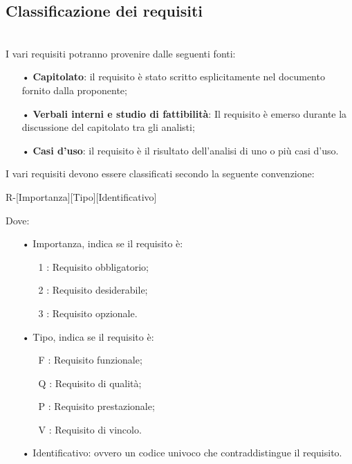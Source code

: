 \subsection{Classificazione dei requisiti}\mbox{}\\
I vari requisiti potranno provenire dalle seguenti fonti:
\begin{itemize}
	\item[•] \textbf{Capitolato}: il requisito è stato scritto esplicitamente nel documento fornito dalla proponente;
	\item[•] \textbf{Verbali interni e studio di fattibilità}: Il requisito è emerso durante la discussione del capitolato tra gli analisti;
	\item[•] \textbf{Casi d'uso}: il requisito è il risultato dell'analisi di uno o più casi d'uso.
\end{itemize}

I vari requisiti devono essere classificati secondo la seguente convenzione:
\begin{center}
	R-[Importanza][Tipo][Identificativo]
\end{center}
Dove:
\begin{itemize}
	\item[•] Importanza, indica se il requisito è:
	\begin{itemize}
		\item[1]: Requisito obbligatorio;
		\item[2]: Requisito desiderabile;
		\item[3]: Requisito opzionale.
	\end{itemize}
	\item[•] Tipo, indica se il requisito è:
	\begin{itemize}
		\item[F]: Requisito funzionale;
		\item[Q]: Requisito di qualità;
		\item[P]: Requisito prestazionale;
		\item[V]: Requisito di vincolo.
	\end{itemize}
	\item[•] Identificativo: ovvero un codice univoco che contraddistingue il requisito.
\end{itemize}

